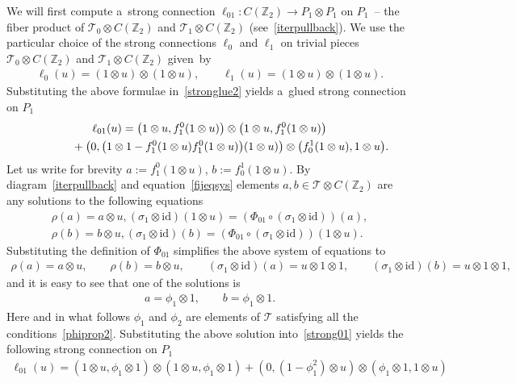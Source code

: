 \documentclass[pdftex]{sigma}
\begin{document}
We will f\/irst compute a~strong connection $\ell_{01}:C({\mathbb Z_2})\rightarrow P_1\otimes P_1$ on $P_1$~-- the f\/iber
product of ${\mathcal{T}}_0\otimes C({\mathbb Z_2})$ and ${\mathcal{T}}_1\otimes C({\mathbb Z_2})$
(see~\eqref{iterpullback}).
We use the particular choice of the strong connections $\ell_0$ and $\ell_1$ on trivial pieces
${\mathcal{T}}_0\otimes C({\mathbb Z_2})$ and ${\mathcal{T}}_1\otimes C({\mathbb Z_2})$ given~by
\begin{gather*}
\ell_0(u)=(1\otimes u)\otimes (1\otimes u),
\qquad
\ell_1(u)=(1\otimes u)\otimes (1\otimes u).
\end{gather*}
Substituting the above formulae in~\eqref{stronglue2} yields a~glued strong connection on $P_1$
\begin{gather}
\ell_{01}(u) =\big(1\otimes u,f^0_1(1\otimes u)\big)\otimes\big(1\otimes u,f^0_1(1\otimes u)\big)
\nonumber
\\
\hphantom{\ell_{01}(u) =}
{}+\big(0,\big(1\otimes 1-f^0_1(1\otimes u)f^0_1(1\otimes u)\big)(1\otimes u) \big)\otimes\big(f^1_0(1\otimes u),1\otimes u
\big).
\label{strong01}
\end{gather}
Let us write for brevity $a:=f^0_1(1\otimes u)$, $b:=f^1_0(1\otimes u)$.
By diagram~\eqref{iterpullback} and equation~\eqref{fijeqsys} elements $a,b\in{\mathcal{T}}\otimes C({\mathbb Z_2})$ are any
solutions to the following equations
\begin{gather*}
\rho(a) =a\otimes u,  (\sigma_1\otimes\mathrm{id})(1\otimes u) =(\Phi_{01}\circ(\sigma_1\otimes\mathrm{id}))(a),
\nonumber
\\
\rho(b) =b\otimes u,  (\sigma_1\otimes\mathrm{id})(b) =(\Phi_{01}\circ(\sigma_1\otimes\mathrm{id}))(1\otimes u).
\end{gather*}
Substituting the def\/inition of $\Phi_{01}$ simplif\/ies the above system of equations to
\begin{gather*}
\rho(a)=a\otimes u,
\qquad\!
\rho(b)=b\otimes u,
\qquad\!
(\sigma_1\otimes\mathrm{id})(a)=u\otimes 1\otimes1,
\qquad\!
(\sigma_1\otimes\mathrm{id})(b)=u\otimes 1\otimes1,
\end{gather*}
and it is easy to see that one of the solutions is
\begin{gather*}
a=\phi_1\otimes1,
\qquad
b=\phi_1\otimes1.
\end{gather*}
Here and in what follows $\phi_1$ and $\phi_2$ are elements of ${\mathcal{T}}$ satisfying all the conditions~\eqref{phiprop2}.
Substituting the above solution into~\eqref{strong01} yields the following strong connection on $P_1$
\begin{gather}
\label{strong01f}
\ell_{01}(u)=(1\otimes u,\phi_1\otimes 1)\otimes(1\otimes u,\phi_1\otimes 1) +(0,(1-\phi_1^2)\otimes u)\otimes
(\phi_1\otimes1,1\otimes u)
\end{gather}
\end{document}
